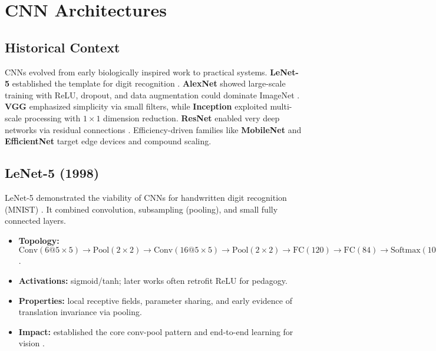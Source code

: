 
\section{CNN Architectures }
\label{sec:cnn-architectures}

\subsection*{Historical Context}
CNNs evolved from early biologically inspired work to practical systems. \textbf{LeNet-5} established the template for digit recognition \cite{LeCun1989}. \textbf{AlexNet} showed large-scale training with ReLU, dropout, and data augmentation could dominate ImageNet \cite{Krizhevsky2012}. \textbf{VGG} emphasized simplicity via small filters, while \textbf{Inception} exploited multi-scale processing with $1\times1$ dimension reduction. \textbf{ResNet} enabled very deep networks via residual connections \cite{He2016}. Efficiency-driven families like \textbf{MobileNet} and \textbf{EfficientNet} target edge devices and compound scaling.
\subsection{LeNet-5 (1998)}
\label{subsec:lenet}

LeNet-5 demonstrated the viability of CNNs for handwritten digit recognition (MNIST) \cite{LeCun1989}. It combined convolution, subsampling (pooling), and small fully connected layers.
\begin{itemize}
    \item \textbf{Topology:} \(\text{Conv}(6@5\times5)\to\text{Pool}(2\times2)\to\text{Conv}(16@5\times5)\to\text{Pool}(2\times2)\to\text{FC}(120)\to\text{FC}(84)\to\text{Softmax}(10)\).
    \item \textbf{Activations:} sigmoid/tanh; later works often retrofit ReLU for pedagogy.
    \item \textbf{Properties:} local receptive fields, parameter sharing, and early evidence of translation invariance via pooling.
    \item \textbf{Impact:} established the core conv-pool pattern and end-to-end learning for vision \cite{GoodfellowEtAl2016}.
\end{itemize}

